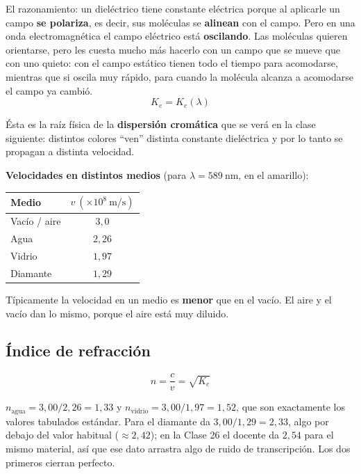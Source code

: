 \documentclass[12pt,a4paper]{article}
\begin{document}
El razonamiento: un dieléctrico tiene constante eléctrica porque al aplicarle un
campo \textbf{se polariza}, es decir, sus moléculas se \textbf{alinean} con el
campo. Pero en una onda electromagnética el campo eléctrico está
\textbf{oscilando}. Las moléculas quieren orientarse, pero les cuesta mucho más
hacerlo con un campo que se mueve que con uno quieto: con el campo estático tienen
todo el tiempo para acomodarse, mientras que si oscila muy rápido, para cuando la
molécula alcanza a acomodarse el campo ya cambió.
\[
\boxed{\ K_e = K_e(\lambda)\ }
\]

\begin{notebox}[Adelanto]
Ésta es la raíz física de la \textbf{dispersión cromática} que se verá en la clase
siguiente: distintos colores \enquote{ven} distinta constante dieléctrica y por lo
tanto se propagan a distinta velocidad.
\end{notebox}



\textbf{Velocidades en distintos medios} (para $\lambda = \SI{589}{\nano\metre}$,
en el amarillo):

\begin{table}[H]
\centering
\begin{tabular}{lc}
\toprule
\textbf{Medio} & $v\ (\times 10^{8}\ \si{\metre\per\second})$ \\
\midrule
Vacío / aire & $3{,}0$  \\
Agua         & $2{,}26$ \\
Vidrio       & $1{,}97$ \\
Diamante     & $1{,}29$ \\
\bottomrule
\end{tabular}
\end{table}

Típicamente la velocidad en un medio es \textbf{menor} que en el vacío. El aire y
el vacío dan lo mismo, porque el aire está muy diluido.

\subsection{Índice de refracción}

\begin{keybox}
\[
\boxed{\ n = \frac{c}{v} = \sqrt{K_e}\ }
\]
\end{keybox}

\begin{notebox}
$n_{\text{agua}} = 3{,}00/2{,}26 = 1{,}33$ y
$n_{\text{vidrio}} = 3{,}00/1{,}97 = 1{,}52$, que son exactamente los valores
tabulados estándar. Para el diamante da $3{,}00/1{,}29 = 2{,}33$, algo por debajo
del valor habitual ($\approx 2{,}42$); en la Clase 26 el docente da $2{,}54$ para
el mismo material, así que ese dato arrastra algo de ruido de transcripción. Los
dos primeros cierran perfecto.
\end{notebox}
\end{document}
